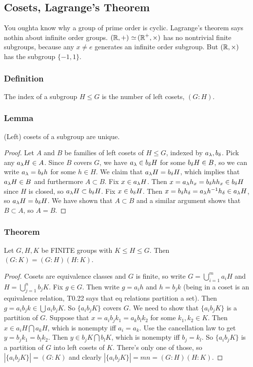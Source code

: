 \subsection{Cosets, Lagrange's Theorem}
You oughta know why a group of prime order is cyclic. Lagrange's theorem says nothin about infinite order groups.
$(\operatorname{\mathbb{R}},+) \operatorname{\,\simeq\,} (\operatorname{\mathbb{R}}^+,\times)$
has no nontrivial finite subgroups, because any $x \neq e$ generates an infinite order subgroup. But $(\operatorname{\mathbb{R}},\times)$ has the subgroup $\{-1,1\}$.
\subsubsection*{Definition}
The index of a subgroup $H \leq G$
is the number of left cosets, $(G:H)$.
\subsubsection*{Lemma}
(Left) cosets of a subgroup are unique.
\begin{proof}
Let $A$ and $B$ be families of left cosets of $H \leq G$, indexed by $a_{\operatorname{\lambda}}, b_{\operatorname{\delta}}$.
Pick any $a_{\operatorname{\lambda}}H \in A$. Since $B$ covers $G$, we have $a_{\operatorname{\lambda}} \in b_{\operatorname{\delta}} H$ for some $b_{\operatorname{\delta}}H \in B$, so we can write $a_{\operatorname{\lambda}} = b_{\operatorname{\delta}}h$ for some $h \in H$. We claim that $a_{\operatorname{\lambda}}H = b_{\operatorname{\delta}}H$, which implies that $a_{\operatorname{\lambda}}H \in B$ and furthermore $A \subset B$.
Fix $x \in a_{\operatorname{\lambda}}H$. Then $x = a_{\operatorname{\lambda}}h_{x} = b_{\operatorname{\delta}}hh_{x} \in b_{\operatorname{\delta}}H$ since $H$ is closed, so $a_{\operatorname{\lambda}}H \subset b_{\operatorname{\delta}}H$. Fix $x \in b_{\operatorname{\delta}}H$. Then $x = b_{\operatorname{\delta}}h_{\operatorname{\delta}} = a_{\operatorname{\lambda}}h^{-1}h_{\operatorname{\delta}} \in a_{\operatorname{\lambda}}H$, so $a_{\operatorname{\lambda}}H = b_{\operatorname{\delta}}H$. We have shown that $A \subset B$ and a similar argument shows that $B \subset A$, so $A = B$.
\end{proof}
\subsubsection*{Theorem}
Let $G,H,K$ be FINITE groups with $K \leq H \leq G$. Then $(G:K) = (G:H)(H:K)$.
\begin{proof}
Cosets are equivalence classes and $G$ is finite, so write $G = \bigcup_{i=1}^m a_i H$ and  $H = \bigcup_{j=1}^n b_j K$.
Fix $g \in G$. Then write $g = a_i h$ and $h = b_j k$ (being in a coset is an equivalence relation, T0.22 says that eq relations partition a set).
Then $g = a_i b_j k \in \bigcup a_i b_j K$. So $\{ a_i b_jK \}$ covers $G$. We need to show that $\{a_ib_j K\}$ is a partition of $G$. Suppose that $x = a_ib_jk_1 = a_kb_lk_2$ for some $k_1,k_2 \in K$.
Then $x \in {a_i}H \bigcap  {a_k}H$, which is nonempty iff $a_i = a_k$. Use the cancellation law to get $y = b_jk_1 = b_lk_2$. Then $y \in {b_j}K \bigcap  {b_l}K$, which is nonempty iff $b_j = k_l$. So $\{a_ib_jK\}$ is a partition of $G$ into left cosets of $K$.
There's only one of those, so $|\{a_ib_jK\}| = (G:K)$ and clearly $|\{a_ib_jK\}| = mn = (G:H)(H:K)$.
\end{proof}
